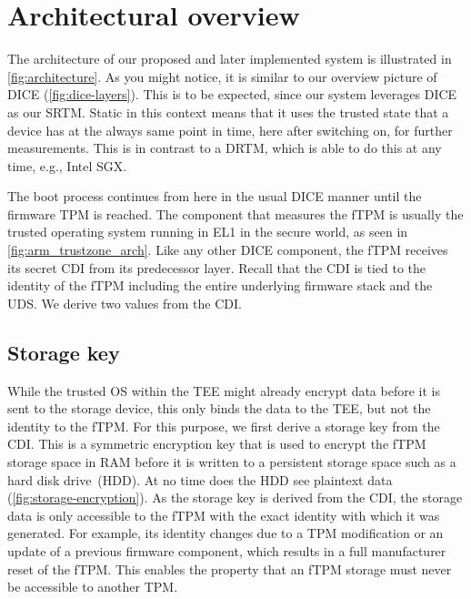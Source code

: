 \section{Architectural overview}\label{sec:arch_overview}



The architecture of our proposed and later implemented system is illustrated in \autoref{fig:architecture}.
As you might notice, it is similar to our overview picture of \ac{DICE} (\autoref{fig:dice-layers}).
This is to be expected, since our system leverages \ac{DICE} as our \ac{SRTM}.
Static in this context means that it uses the trusted state that a device has at the always same point in time, here after switching on, for further measurements.
This is in contrast to a \ac{DRTM}, which is able to do this at any time, e.g., Intel SGX\@.

The boot process continues from here in the usual \ac{DICE} manner until the firmware TPM is reached.
The component that measures the \ac{fTPM} is usually the trusted operating system running in EL1 in the secure world, as seen in \autoref{fig:arm_trustzone_arch}.
Like any other \ac{DICE} component, the \ac{fTPM} receives its secret \ac{CDI} from its predecessor layer.
Recall that the \ac{CDI} is tied to the identity of the \ac{fTPM} including the entire underlying firmware stack and the \ac{UDS}\@.
We derive two values from the \ac{CDI}\@.

\subsection{Storage key}


While the trusted OS within the \ac{TEE} might already encrypt data before it is sent to the storage device, this only binds the data to the \ac{TEE}, but not the identity to the \ac{fTPM}.
For this purpose, we first derive a storage key from the \ac{CDI}.
This is a symmetric encryption key that is used to encrypt the \ac{fTPM} storage space in RAM before it is written to a persistent storage space such as a hard disk drive~(HDD).
At no time does the HDD see plaintext data (\autoref{fig:storage-encryption}).
As the storage key is derived from the \ac{CDI}, the storage data is only accessible to the \ac{fTPM} with the exact identity with which it was generated.
For example, its identity changes due to a \ac{TPM} modification or an update of a previous firmware component, which results in a full manufacturer reset of the fTPM\@.
This enables the property that an \ac{fTPM} storage must never be accessible to another \ac{TPM}\@.

